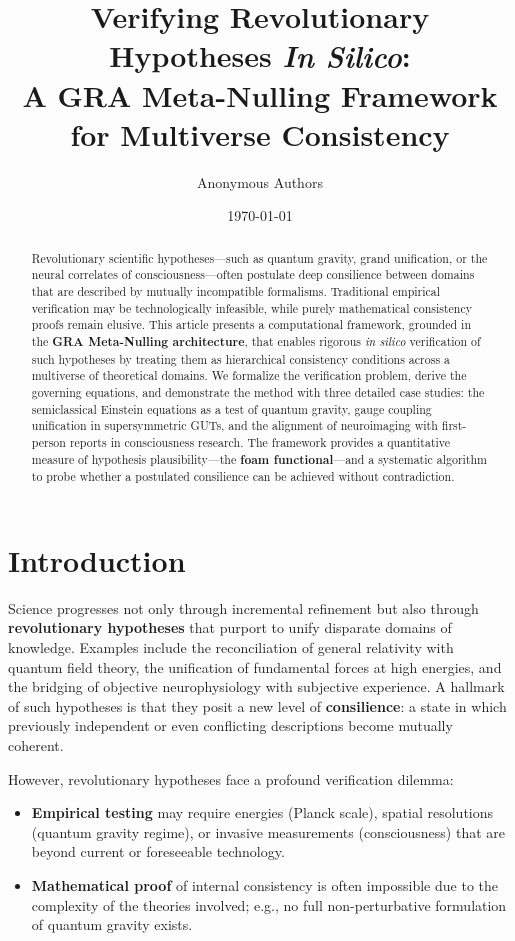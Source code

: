 \documentclass[11pt,a4paper]{article}
\title{\textbf{Verifying Revolutionary Hypotheses \emph{In Silico}:\\ A GRA Meta-Nulling Framework for Multiverse Consistency}}
\author{Anonymous Authors}
\date{\today}
\begin{document}
\maketitle

\begin{abstract}
Revolutionary scientific hypotheses—such as quantum gravity, grand unification, or the neural correlates of consciousness—often postulate deep consilience between domains that are described by mutually incompatible formalisms. Traditional empirical verification may be technologically infeasible, while purely mathematical consistency proofs remain elusive. This article presents a computational framework, grounded in the \textbf{GRA Meta-Nulling architecture}, that enables rigorous \emph{in silico} verification of such hypotheses by treating them as hierarchical consistency conditions across a multiverse of theoretical domains. We formalize the verification problem, derive the governing equations, and demonstrate the method with three detailed case studies: the semiclassical Einstein equations as a test of quantum gravity, gauge coupling unification in supersymmetric GUTs, and the alignment of neuroimaging with first-person reports in consciousness research. The framework provides a quantitative measure of hypothesis plausibility—the \textbf{foam functional}—and a systematic algorithm to probe whether a postulated consilience can be achieved without contradiction.
\end{abstract}

\section{Introduction}

Science progresses not only through incremental refinement but also through \textbf{revolutionary hypotheses} that purport to unify disparate domains of knowledge. Examples include the reconciliation of general relativity with quantum field theory, the unification of fundamental forces at high energies, and the bridging of objective neurophysiology with subjective experience. A hallmark of such hypotheses is that they posit a new level of \textbf{consilience}: a state in which previously independent or even conflicting descriptions become mutually coherent.

However, revolutionary hypotheses face a profound verification dilemma:
\begin{itemize}
    \item \textbf{Empirical testing} may require energies (Planck scale), spatial resolutions (quantum gravity regime), or invasive measurements (consciousness) that are beyond current or foreseeable technology.
    \item \textbf{Mathematical proof} of internal consistency is often impossible due to the complexity of the theories involved; e.g., no full non-perturbative formulation of quantum gravity exists.
\end{itemize}
\end{document}
